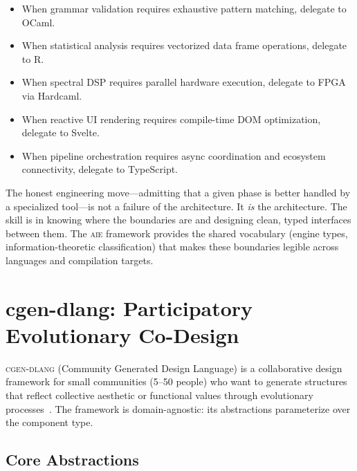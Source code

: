 \documentclass[11pt,letterpaper]{article}
\newcommand{\aie}{\textsc{aie}}
\newcommand{\cgen}{\textsc{cgen-dlang}}
\begin{document}
\begin{itemize}[leftmargin=*]
  \item When grammar validation requires exhaustive pattern matching, delegate to OCaml.
  \item When statistical analysis requires vectorized data frame operations, delegate to R.
  \item When spectral DSP requires parallel hardware execution, delegate to FPGA via Hardcaml.
  \item When reactive UI rendering requires compile-time DOM optimization, delegate to Svelte.
  \item When pipeline orchestration requires async coordination and ecosystem connectivity, delegate to TypeScript.
\end{itemize}

The honest engineering move---admitting that a given phase is better handled by a specialized tool---is not a failure of the architecture. It \textit{is} the architecture. The skill is in knowing where the boundaries are and designing clean, typed interfaces between them. The \aie{} framework provides the shared vocabulary (engine types, information-theoretic classification) that makes these boundaries legible across languages and compilation targets.

\section{cgen-dlang: Participatory Evolutionary Co-Design}
\label{sec:cgen}

\cgen{} (Community Generated Design Language) is a collaborative design framework for small communities (5--50 people) who want to generate structures that reflect collective aesthetic or functional values through evolutionary processes~\cite{cgen2020}. The framework is domain-agnostic: its abstractions parameterize over the component type.

\subsection{Core Abstractions}
\end{document}
